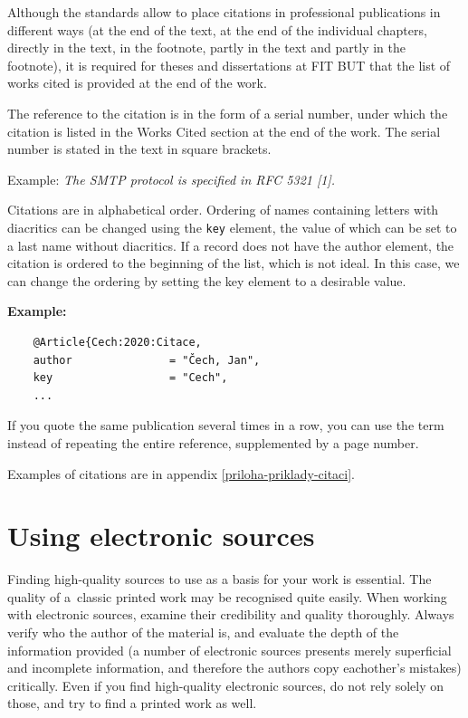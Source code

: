 Although the standards allow to place citations in professional publications in different ways (at the end of the text, at the end of the individual chapters, directly in the text, in the footnote, partly in the text and partly in the footnote), it is required for theses and dissertations at FIT BUT that the list of works cited is provided at the end of the work.

The reference to the citation is in the form of a serial number, under which the citation is listed in the Works Cited section at the end of the work. The serial number is stated in the text in square brackets.

\noindent Example: \textit{The SMTP protocol is specified in RFC 5321 [1].}

Citations are in alphabetical order. Ordering of names containing letters with diacritics can be changed using the \texttt{key} element, the value of which can be set to a last name without diacritics. If a record does not have the author element, the citation is ordered to the beginning of the list, which is not ideal. In this case, we can change the ordering by setting the key element to a desirable value.

\textbf{Example:}
\begin{verbatim}
    @Article{Cech:2020:Citace,
    author               = "Čech, Jan",
    key                  = "Cech",
    ...
\end{verbatim}

If you quote the same publication several times in a row, you can use the 
term  instead of repeating the entire reference, supplemented 
by a page number.

Examples of citations are in appendix \ref{priloha-priklady-citaci}.

\section{Using electronic sources}

Finding high-quality sources to use as a basis for your work is essential. The quality of a~classic printed work may be recognised quite easily. When working with electronic sources, examine their credibility and quality thoroughly. Always verify who the author of the material is, and evaluate the depth of the information provided (a number of electronic sources presents merely superficial and incomplete information, and therefore the authors copy eachother's mistakes) critically.
Even if you find high-quality electronic sources, do not rely solely on those, and try to find a printed work as well.

